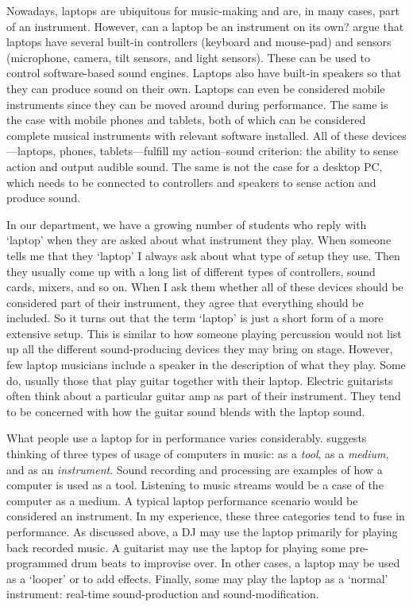 Nowadays, laptops are ubiquitous for music-making and are, in many cases, part of an instrument. However, can a laptop be an instrument on its own? \citet{fiebrink_dont_2007} argue that laptops have several built-in controllers (keyboard and mouse-pad) and sensors (microphone, camera, tilt sensors, and light sensors). These can be used to control software-based sound engines. Laptops also have built-in speakers so that they can produce sound on their own. Laptops can even be considered mobile instruments since they can be moved around during performance. The same is the case with mobile phones and tablets, both of which can be considered complete musical instruments with relevant software installed. All of these devices---laptops, phones, tablets---fulfill my action--sound criterion: the ability to sense action and output audible sound. The same is not the case for a desktop PC, which needs to be connected to controllers and speakers to sense action and produce sound.

In our department, we have a growing number of students who reply with `laptop' when they are asked about what instrument they play. When someone tells me that they `laptop' I always ask about what type of setup they use. Then they usually come up with a long list of different types of controllers, sound cards, mixers, and so on. When I ask them whether all of these devices should be considered part of their instrument, they agree that everything should be included. So it turns out that the term `laptop' is just a short form of a more extensive setup. This is similar to how someone playing percussion would not list up all the different sound-producing devices they may bring on stage. However, few laptop musicians include a speaker in the description of what they play. Some do, usually those that play guitar together with their laptop. Electric guitarists often think about a particular guitar amp as part of their instrument. They tend to be concerned with how the guitar sound blends with the laptop sound.

What people use a laptop for in performance varies considerably. \citet{brown_computers_2012} suggests thinking of three types of usage of computers in music: as a \emph{tool}, as a \emph{medium}, and as an \emph{instrument}. Sound recording and processing are examples of how a computer is used as a tool. Listening to music streams would be a case of the computer as a medium. A typical laptop performance scenario would be considered an instrument. In my experience, these three categories tend to fuse in performance. As discussed above, a DJ may use the laptop primarily for playing back recorded music. A guitarist may use the laptop for playing some pre-programmed drum beats to improvise over. In other cases, a laptop may be used as a `looper' or to add effects. Finally, some may play the laptop as a `normal' instrument: real-time sound-production and sound-modification.


